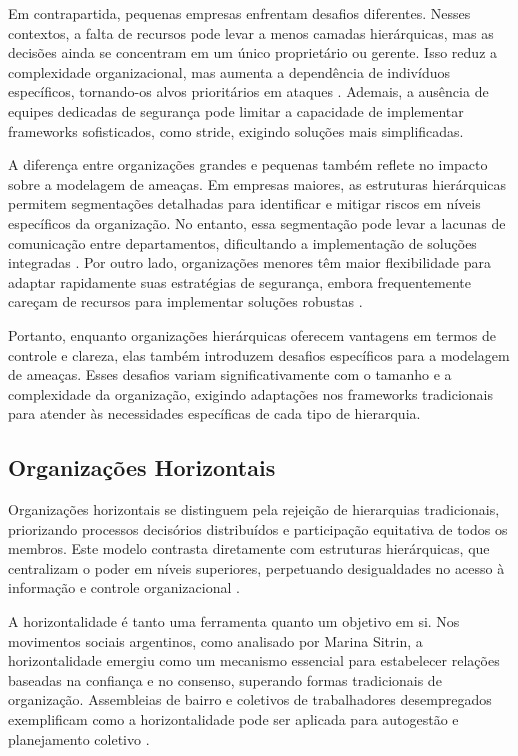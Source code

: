 Em contrapartida, pequenas empresas enfrentam desafios diferentes. Nesses
contextos, a falta de recursos pode levar a menos camadas hierárquicas, mas
as decisões ainda se concentram em um único proprietário ou gerente. Isso
reduz a complexidade organizacional, mas aumenta a dependência de
indivíduos específicos, tornando-os alvos prioritários em ataques
\cite{WorkerCooperativesinAmerica}. Ademais, a ausência de equipes
dedicadas de segurança pode limitar a capacidade de implementar frameworks
sofisticados, como \gls{stride}, exigindo soluções mais simplificadas.

A diferença entre organizações grandes e pequenas também reflete no impacto
sobre a modelagem de ameaças. Em empresas maiores, as estruturas
hierárquicas permitem segmentações detalhadas para identificar e mitigar
riscos em níveis específicos da organização. No entanto, essa segmentação
pode levar a lacunas de comunicação entre departamentos, dificultando a
implementação de soluções integradas
\cite{ThreatModelingASystematicLiteratureReview}. Por outro lado,
organizações menores têm maior flexibilidade para adaptar rapidamente suas
estratégias de segurança, embora frequentemente careçam de recursos para
implementar soluções robustas \cite{WorkerCooperativesandRevolution}.

Portanto, enquanto organizações hierárquicas oferecem vantagens em termos
de controle e clareza, elas também introduzem desafios específicos para a
modelagem de ameaças. Esses desafios variam significativamente com o
tamanho e a complexidade da organização, exigindo adaptações nos frameworks
tradicionais para atender às necessidades específicas de cada tipo de
hierarquia.

\subsection{Organizações Horizontais}
\label{sec:organizacoes_horizontais}

Organizações horizontais se distinguem pela rejeição de hierarquias
tradicionais, priorizando processos decisórios distribuídos e participação
equitativa de todos os membros. Este modelo contrasta diretamente com
estruturas hierárquicas, que centralizam o poder em níveis superiores,
perpetuando desigualdades no acesso à informação e controle organizacional
\cite{Non-HierarchicalForms, EstatutosDoPCP}.

A horizontalidade é tanto uma ferramenta quanto um objetivo em si. Nos
movimentos sociais argentinos, como analisado por Marina Sitrin, a
horizontalidade emergiu como um mecanismo essencial para estabelecer
relações baseadas na confiança e no consenso, superando formas tradicionais
de organização. Assembleias de bairro e coletivos de trabalhadores
desempregados exemplificam como a horizontalidade pode ser aplicada para
autogestão e planejamento coletivo \cite{EverydayRevolutions}.

